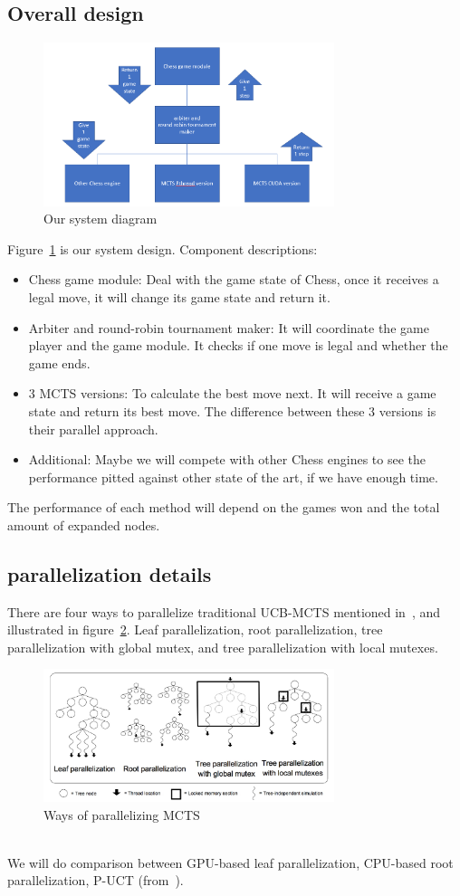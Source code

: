 \documentclass[sigconf]{acmart}
\begin{document}
\subsection{Overall design}
\begin{figure}[h]
  \includegraphics[width=8.5cm]{system-design.png}
  \caption{Our system diagram}
\label{fig:system_design}
\end{figure}
Figure~\ref{fig:system_design} is our system design. Component descriptions:
\begin{itemize}
  \item Chess game module: Deal with the game state of Chess, once it receives a legal move, it will change its game state and return it.
  \item Arbiter and round-robin tournament maker: It will coordinate the game player and the game module. It checks if one move is legal and whether the game ends.
  \item 3 MCTS versions: To calculate the best move next. It will receive a game state and return its best move. The difference between these 3 versions is their parallel approach.
  \item Additional: Maybe we will compete with other Chess engines to see the performance pitted against other state of the art, if we have enough time.
\end{itemize}
The performance of each method will depend on the games won and the total amount of expanded nodes. 

\subsection{parallelization details}
There are four ways to parallelize traditional UCB-MCTS mentioned in~\cite{guillaumeMCTS}, and illustrated in figure~\ref{fig:mcts_parallel}. Leaf parallelization, root parallelization, tree parallelization with global mutex, and tree parallelization with local mutexes. 
\begin{figure}[h]
  \includegraphics[width=8.5cm]{MCTS-parallel.png}
  \caption{Ways of parallelizing MCTS}
\label{fig:mcts_parallel}
\end{figure}\\
We will do comparison between GPU-based leaf parallelization, CPU-based root parallelization, P-UCT (from~\cite{Liu2020Watch}).
\end{document}
